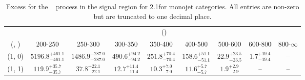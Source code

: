 \begin{table}[h!]
\tiny
\centering
\caption{Excess for the \zInv~ process in the signal region for 2.1\ifb for monojet categories. All entries are non-zero but are truncated to one decimal place.\label{tab:excesssep_sig_zinv_mono}}
\begin{tabular}
{ccccccccc}
	\hline\hline
	& \multicolumn{8}{c}{\scalht (\gev)} \\ 
	 (\njet,  \nb) & 200-250 & 250-300 & 300-350 & 350-400 & 400-500 & 500-600 & 600-800 & 800-$\infty$ \\ [0.8ex] 
\hline
	(1, 0) & $5196.8^{+ 461.1 }_{- 461.1 }$ & $1486.9^{+ 287.0 }_{- 287.0 }$ & $490.6^{+ 94.2 }_{- 94.2 }$ & $251.8^{+ 70.4 }_{- 70.4 }$ & $158.6^{+ 51.1 }_{- 51.1 }$ & $22.9^{+ 23.5 }_{- 23.5 }$ & $1.7^{+ 19.4 }_{- 19.4 }$ & -- \\[0.5ex] 
	(1, 1) & $119.9^{+ 35.7 }_{- 35.7 }$ & $37.8^{+ 22.1 }_{- 22.1 }$ & $12.7^{+ 11.4 }_{- 11.4 }$ & $10.3^{+ 7.0 }_{- 7.0 }$ & $11.6^{+ 5.7 }_{- 5.7 }$ & $1.9^{+ 2.9 }_{- 2.9 }$ & -- & -- \\[0.5ex] 
	\hline
	\hline
\end{tabular}
\end{table}
